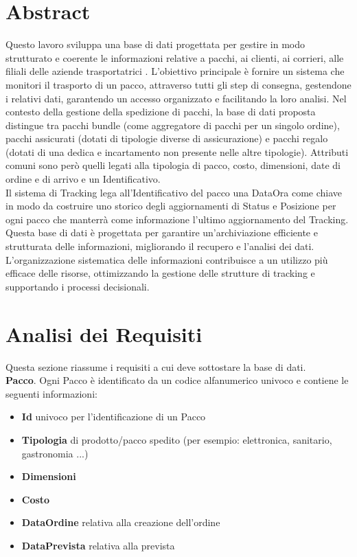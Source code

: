 \section{Abstract}
Questo lavoro sviluppa una base di dati progettata per gestire in modo strutturato e
coerente le informazioni relative a pacchi, ai clienti, ai corrieri, alle filiali delle aziende trasportatrici . L’obiettivo principale è fornire un sistema che monitori il trasporto di un pacco, attraverso tutti gli step di consegna, gestendone i relativi dati, garantendo un accesso organizzato e facilitando la loro analisi.
Nel contesto della gestione della spedizione di pacchi, la base di dati proposta distingue tra pacchi bundle (come aggregatore di pacchi per un singolo ordine), pacchi assicurati (dotati di tipologie diverse di assicurazione) e pacchi regalo (dotati di una dedica e incartamento non presente nelle altre tipologie). Attributi comuni sono però quelli legati alla tipologia di pacco, costo, dimensioni, date di ordine e di arrivo e un Identificativo.\\ 
Il sistema di Tracking lega all'Identificativo del pacco una DataOra come chiave in modo da costruire uno storico degli aggiornamenti di Status e Posizione per ogni pacco che manterrà come informazione l'ultimo aggiornamento del Tracking. \\Questa base di dati è progettata per garantire un’archiviazione efficiente e strutturata delle informazioni, migliorando il recupero e l’analisi dei dati. L’organizzazione sistematica delle informazioni contribuisce a un utilizzo più efficace delle risorse, ottimizzando la gestione delle strutture di tracking e supportando i processi decisionali.

\section{Analisi dei Requisiti}
Questa sezione riassume i requisiti a cui deve sottostare la base di dati.\\
\textbf{Pacco}. Ogni Pacco è identificato da un codice alfanumerico univoco e contiene le seguenti
informazioni:\\
\begin{itemize}
    \setlength{\itemindent}{+.5in}
    \item \textbf{Id} univoco per l'identificazione di un Pacco
    \item \textbf{Tipologia} di prodotto/pacco spedito \footnotesize{(per esempio: elettronica, sanitario, gastronomia ...)}
    \item \normalsize{\textbf{Dimensioni}}
    \item \textbf{Costo}
    \item \textbf{DataOrdine} relativa alla creazione dell'ordine
    \item \textbf{DataPrevista} relativa alla prevista 

\end{itemize}

